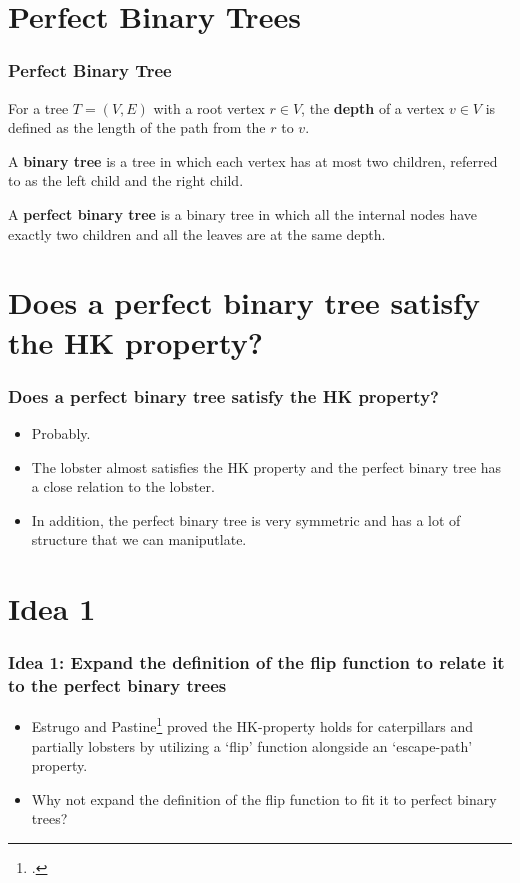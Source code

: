 \documentclass[10pt,]{beamer}
\theoremstyle{conjectureStyle}
\theoremstyle{notationStyle}
\begin{document}
\section{Perfect Binary Trees}
\begin{frame}\frametitle{Perfect Binary Tree}
    \begin{definition}
        For a tree $T = (V, E)$ with a root vertex $r \in V$, the \textbf{depth} of a vertex $v \in V$ is defined as the length of the path from the $r$ to $v$.
    \end{definition}
    \begin{definition}
        A \textbf{binary tree} is a tree in which each vertex has at most two children, referred to as the left child and the right child.
    \end{definition}
    \begin{definition}
        A \textbf{perfect binary tree} is a binary tree in which all the internal nodes have exactly two children and all the leaves are at the same depth.
    \end{definition}
\end{frame}



\section{Does a perfect binary tree satisfy the HK property?}
\begin{frame}\frametitle{Does a perfect binary tree satisfy the HK property?}
    \begin{itemize}
        \setlength\itemsep{2em}
        \item Probably.
        \item The lobster almost satisfies the HK property and the perfect binary tree has a close relation to the lobster.
        \item In addition, the perfect binary tree is very symmetric and has a lot of structure that we can maniputlate.
    \end{itemize}
\end{frame}

\section{Idea 1}
\begin{frame}\frametitle{Idea 1: Expand the definition of the flip function to relate it to the perfect binary trees}
    \begin{itemize}
        \item Estrugo and Pastine\footcite{MR2763040} proved the HK-property holds for caterpillars and partially lobsters by utilizing a `flip' function alongside an `escape-path' property.

        \item Why not expand the definition of the flip function to fit it to perfect binary trees?
    \end{itemize}
\end{frame}
\end{document}
